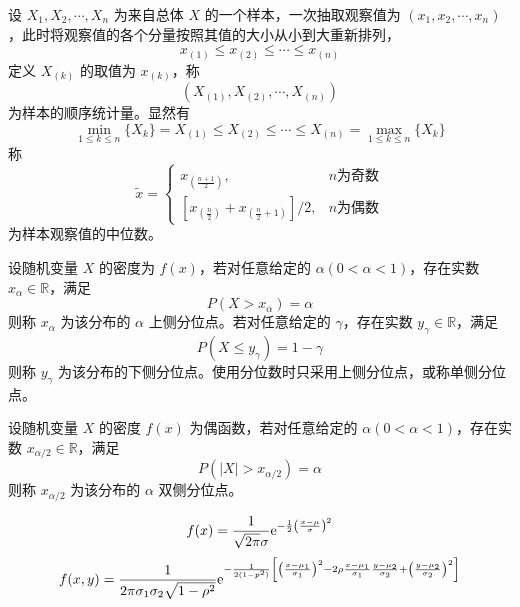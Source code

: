 \documentclass{ctexbook}
\def\e{\textnormal{e}}
\begin{document}
\begin{definition}[顺序统计量]
    设 $X_1,X_2,\cdots,X_n$ 为来自总体 $X$ 的一个样本，一次抽取观察值为 $(x_1,x_2,\cdots,x_n)$，此时将观察值的各个分量按照其值的大小从小到大重新排列，
    \begin{equation}
        x_{(1)}\leq x_{(2)}\leq \cdots \leq x_{(n)}
    \end{equation}
    定义 $X_{(k)}$ 的取值为 $x_{(k)}$，称
    \begin{equation}
        (X_{(1)}, X_{(2)}, \cdots , X_{(n)})
    \end{equation}
    为样本的顺序统计量。显然有
    \begin{equation}
        \min_{1\leq k\leq n}\{X_k\}=X_{(1)}\leq X_{(2)}\leq \cdots \leq X_{(n)}=\max_{1\leq k\leq n}\{X_k\}
    \end{equation}
    称
    \begin{equation}
        \tilde{x}=\begin{cases}
            x_{(\frac{n+1}{2})},&n\text{为奇数}\\
            [x_{(\frac{n}{2})}+x_{(\frac{n}{2}+1)}]/2,&n\text{为偶数}
        \end{cases}
    \end{equation}
    为样本观察值的中位数。
\end{definition}

\begin{definition}[分位点]
    设随机变量 $X$ 的密度为 $f(x)$，若对任意给定的 $\alpha(0<\alpha<1)$，存在实数 $x_\alpha\in\mathbb{R}$，满足
    \begin{equation}
        P(X>x_\alpha)=\alpha
    \end{equation}
    则称 $x_\alpha$ 为该分布的 $\alpha$ 上侧分位点。若对任意给定的 $\gamma$，存在实数 $y_\gamma\in\mathbb{R}$，满足
    \begin{equation}
        P(X\leq y_\gamma)=1-\gamma
    \end{equation}
    则称 $y_\gamma$ 为该分布的下侧分位点。使用分位数时只采用上侧分位点，或称单侧分位点。

    设随机变量 $X$ 的密度 $f(x)$ 为偶函数，若对任意给定的 $\alpha(0<\alpha<1)$，存在实数 $x_{\alpha/2}\in\mathbb{R}$，满足
    \begin{equation}
        P(|X|>x_{\alpha/2})=\alpha
    \end{equation}
    则称 $x_{\alpha/2}$ 为该分布的 $\alpha$ 双侧分位点。
\end{definition}

\begin{definition}[正态分布]
    \begin{equation}
        f(x)=\frac{1}{\sqrt{2\pi}\sigma}\e^{-\frac{1}{2}\left(\frac{x-\mu}{\sigma}\right)^2}
    \end{equation}
    \begin{equation}
        f(x,y)=\frac{1}{2\pi\sigma_1\sigma_2\sqrt{1-\rho^2}}\e^{-\frac{1}{2(1-p^2)}\left[\left(\frac{x-\mu_1}{\sigma_1}\right)^2-2\rho\frac{x-\mu_1}{\sigma_1}\frac{y-\mu_2}{\sigma_2}+\left(\frac{y-\mu_2}{\sigma_2}\right)^2\right]}
    \end{equation}
\end{definition}
\end{document}
